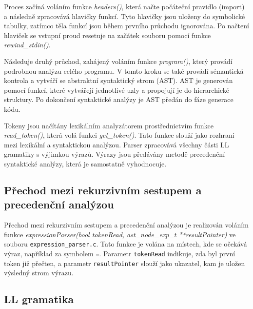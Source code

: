 \documentclass[a4paper, 12pt]{article}
\begin{document}
Proces začíná voláním funkce \textit{headers()}, která načte počáteční pravidlo (import) a následně zpracovává hlavičky funkcí. Tyto hlavičky jsou uloženy do symbolické tabulky, zatímco těla funkcí jsou během prvního průchodu ignorována. Po načtení hlaviček se vstupní proud resetuje na začátek souboru pomocí funkce \textit{rewind\_stdin()}.

Následuje druhý průchod, zahájený voláním funkce \textit{program()}, který provádí podrobnou analýzu celého programu. V tomto kroku se také provádí sémantická kontrola a vytváří se abstraktní syntaktický strom (AST). AST je generován pomocí funkcí, které vytvářejí jednotlivé uzly a propojují je do hierarchické struktury. Po dokončení syntaktické analýzy je AST předán do fáze generace kódu.

Tokeny jsou načítány lexikálním analyzátorem prostřednictvím funkce \textit{read\_token()}, která volá funkci \textit{get\_token()}. Tato funkce slouží jako rozhraní mezi lexikální a syntaktickou analýzou. Parser zpracovává všechny části LL gramatiky s výjimkou výrazů. Výrazy jsou předávány metodě precedenční syntaktické analýzy, která je samostatně vyhodnocuje.

\subsection{Přechod mezi rekurzivním sestupem a precedenční analýzou}
Přechod mezi rekurzivním sestupem a precedenční analýzou je realizován voláním funkce \textit{expressionParser(bool tokenRead, ast\_node\_exp\_t **resultPointer)} ve souboru \texttt{expression\_parser.c}. Tato funkce je volána na místech, kde se očekává výraz, například za symbolem \texttt{=}. Parametr \texttt{tokenRead} indikuje, zda byl první token již přečten, a parametr \texttt{resultPointer} slouží jako ukazatel, kam je uložen výsledný strom výrazu.

\vspace{4cm}

\newpage

\subsection{LL gramatika}
\end{document}
